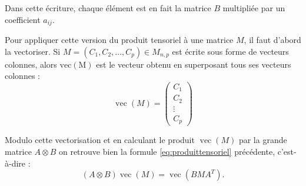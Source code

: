 \documentclass[11pt,class=report,crop=false]{standalone}
\begin{document}
Dans cette écriture, chaque élément est en fait la matrice $B$ multipliée par un coefficient $a_{ij}$. 

Pour appliquer cette version du produit tensoriel à une matrice $M$, il faut d'abord la vectoriser.
Si $M = (C_1, C_2, \ldots, C_p) \in M_{n,p}$ est écrite sous forme de vecteurs colonnes, alors $\operatorname{vec(M)}$ est le vecteur obtenu en superposant tous ses vecteurs colonnes :
$$\operatorname{vec}(M) = \begin{pmatrix} C_1 \\ C_2 \\ \vdots \\ C_p \end{pmatrix}$$

Modulo cette vectorisation et en calculant le produit $\operatorname{vec}(M)$ par la grande matrice $A \otimes B$ on retrouve bien la formule \eqref{eq:produittensoriel} précédente, c'est-à-dire :
$$(A \otimes B) \operatorname{vec}(M) = \operatorname{vec}(B M A^T).$$
\end{document}
